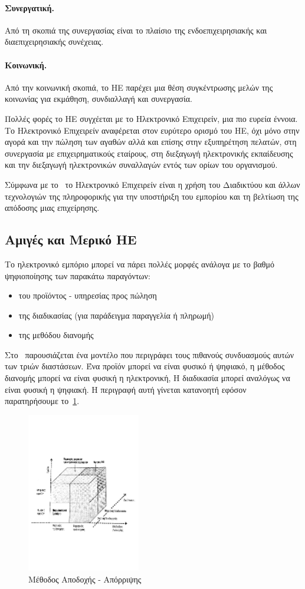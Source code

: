 \documentclass[12pt]{report}
\begin{document}
  \paragraph{Συνεργατική.} Από τη σκοπιά της συνεργασίας είναι το πλαίσιο της ενδοεπιχειρησιακής και διαεπιχειρησιακής συνέχειας.
  \paragraph{Κοινωνική.} Από την κοινωνική σκοπιά, το ΗΕ παρέχει μια θέση συγκέντρωσης μελών της κοινωνίας για εκμάθηση, συνδιαλλαγή και συνεργασία.

Πολλές φορές το ΗΕ συγχέεται με το Ηλεκτρονικό Επιχειρείν, μια πιο ευρεία έννοια. Το Ηλεκτρονικό Επιχειρείν αναφέρεται στον ευρύτερο ορισμό του ΗΕ, όχι μόνο στην αγορά και την πώληση των αγαθών αλλά και επίσης στην εξυπηρέτηση πελατών, στη συνεργασία με επιχειρηματικούς εταίρους, στη διεξαγωγή ηλεκτρονικής εκπαίδευσης και την διεξαγωγή ηλεκτρονικών συναλλαγών εντός των ορίων του οργανισμού.

Σύμφωνα με το~\cite{chen_2005} το Ηλεκτρονικό Επιχειρείν είναι η χρήση του Διαδικτύου και άλλων τεχνολογιών της πληροφορικής για την υποστήριξη του εμπορίου και τη βελτίωση της απόδοσης μιας επιχείρησης.

\subsection{Αμιγές και Μερικό ΗΕ}
Το ηλεκτρονικό εμπόριο μπορεί να πάρει πολλές μορφές ανάλογα με το βαθμό ψηφιοποίησης των παρακάτω παραγόντων:
\begin{itemize}
  \item του προϊόντος - υπηρεσίας προς πώληση
  \item της διαδικασίας (για παράδειγμα παραγγελία ή πληρωμή)
  \item της μεθόδου διανομής
\end{itemize}

Στο~\cite{choi_stahl_whinston_1997} παρουσιάζεται ένα μοντέλο που περιγράφει τους πιθανούς συνδυασμούς αυτών των τριών διαστάσεων. Ένα προϊόν μπορεί να είναι φυσικό ή ψηφιακό, η μέθοδος διανομής μπορεί να είναι φυσική η ηλεκτρονική, Η διαδικασία μπορεί αναλόγως να είναι φυσική η ψηφιακή. Η περιγραφή αυτή γίνεται κατανοητή εφόσον παρατηρήσουμε το~\ref{fig:ec_dimensions}.
\begin{figure}[h]
\includegraphics[width=0.9\linewidth, height=7cm]{ec-dimensions}
\caption{Μέθοδος Αποδοχής - Απόρριψης}
\label{fig:ec_dimensions}
\end{figure}
\end{document}
